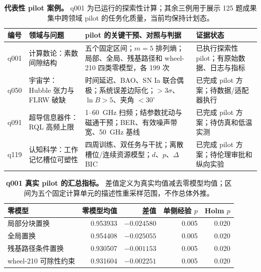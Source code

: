 \documentclass[12pt]{article}
\begin{document}
\begin{table}[p]
	\centering
	\small
	\caption{\textbf{代表性 pilot 案例。} q001 为已运行的探索性计算；其余三例用于展示 125 题成果集中跨领域 pilot 的任务化质量，当前均保持计划态。}
	\label{tab:cases}
	\begin{tabular}{p{}p{}p{}p{}}
		\\
		\hline
		编号 & 领域与问题 & pilot 的关键干预、对照与判据 & 证据状态\\
		\hline
		q001 & 计算数论：素数间隙结构 & 五个固定区间；$m=5$ 排列熵；局部、全局、残基路径和 wheel-210 四类零模型，各 199 次 & 已执行探索性 pilot；有原始数据、日志与指标\\
		q050 & 宇宙学：Hubble 张力与 FLRW 破缺 & 时间延迟、BAO、SN Ia 联合偶极；系统误差边际化；$>3\sigma$、$\ln B>5$、夹角 $<30^\circ$ & 已完成 pilot 方案；待数据/适配器执行\\
		q091 & 超导信息器件：RQL 高频上限 & 1--60~GHz 扫频；结参数扰动与磁通干预；BER、有效噪声带宽、50~GHz 基线 & 已完成 pilot 方案；待仿真和低温实测\\
		q119 & 认知科学：工作记忆槽位可塑性 & 四周训练、双任务与干扰；离散槽位/连续资源模型；$d$、$p$、$\Delta$BIC & 已完成 pilot 方案；待伦理审批和纵向实验\\
		\hline
	\end{tabular}
\end{table}

\begin{table}[p]
	\centering
	\small
	\caption{\textbf{q001 真实 pilot 的汇总指标。} 差值定义为真实均值减去零模型均值；区间为五个固定计算单元的描述性重采样范围，不作总体外推。}
	\label{tab:q001}
	\begin{tabular}{p{}rrrr}
		\\
		\hline
		零模型 & 零模型均值 & 差值 & 单侧经验 $p$ & Holm $p$\\
		\hline
		局部分块置换 & 0.953933 & $-0.024580$ & 0.005 & 0.020\\
		全局置换 & 0.954408 & $-0.025055$ & 0.005 & 0.020\\
		残基路径条件置换 & 0.930507 & $-0.001153$ & 0.005 & 0.020\\
		wheel-210 可除性约束 & 0.931604 & $-0.002251$ & 0.005 & 0.020\\
		\hline
	\end{tabular}
\end{table}
\end{document}
